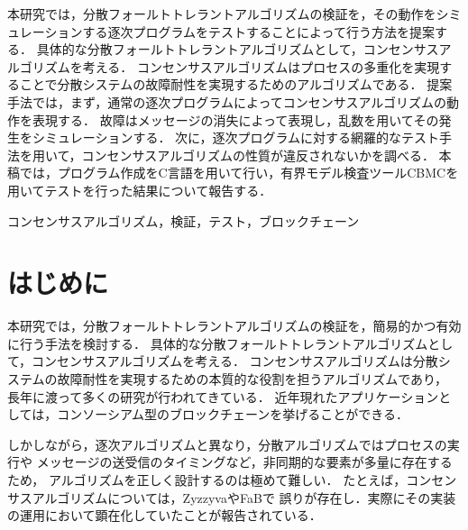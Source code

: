 \documentclass[technicalreport]{ieicej}
\def\IEICEJcls{\texttt{ieicej.cls}}
\def\IEICEJver{3.1}
\theoremstyle{plain}
\begin{document}
\begin{jabstract}
本研究では，分散フォールトトレラントアルゴリズムの検証を，その動作をシミュレーションする逐次プログラムをテストすることによって行う方法を提案する．
具体的な分散フォールトトレラントアルゴリズムとして，コンセンサスアルゴリズムを考える．
コンセンサスアルゴリズムはプロセスの多重化を実現することで分散システムの故障耐性を実現するためのアルゴリズムである．
提案手法では，まず，通常の逐次プログラムによってコンセンサスアルゴリズムの動作を表現する．
故障はメッセージの消失によって表現し，乱数を用いてその発生をシミュレーションする．
次に，逐次プログラムに対する網羅的なテスト手法を用いて，コンセンサスアルゴリズムの性質が違反されないかを調べる．
本稿では，プログラム作成をC言語を用いて行い，有界モデル検査ツールCBMCを用いてテストを行った結果について報告する．
\end{jabstract}
\begin{jkeyword}
	コンセンサスアルゴリズム，検証，テスト，ブロックチェーン
\end{jkeyword}
\maketitle

\section{はじめに}

本研究では，分散フォールトトレラントアルゴリズムの検証を，簡易的かつ有効に行う手法を検討する．
具体的な分散フォールトトレラントアルゴリズムとして，コンセンサスアルゴリズムを考える．
コンセンサスアルゴリズムは分散システムの故障耐性を実現するための本質的な役割を担うアルゴリズムであり，
長年に渡って多くの研究が行われてきている．
近年現れたアプリケーションとしては，コンソーシアム型のブロックチェーンを挙げることができる．

しかしながら，逐次アルゴリズムと異なり，分散アルゴリズムではプロセスの実行や
メッセージの送受信のタイミングなど，非同期的な要素が多量に存在するため，
アルゴリズムを正しく設計するのは極めて難しい．
たとえば，コンセンサスアルゴリズムについては，Zyzzyva\cite{KotlaADCW09}やFaB\cite{MartinA05}で
誤りが存在し．実際にその実装の運用において顕在化していたことが報告されている．
\end{document}
